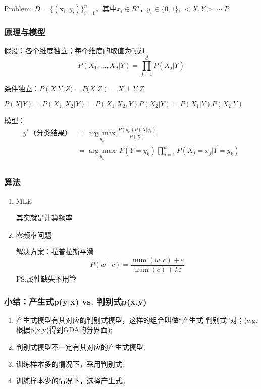 \documentclass[UTF8]{ctexart}
\begin{document}
Problem: $D=\{( \boldsymbol{x}_{i},y_i)\}_{i=1}^{n}$，其中$x_i \in R^d$，$y_i\in \{0,1\}$,  $<X,Y> \sim P$

\dotfill

\subsubsection{原理与模型}

假设：各个维度独立；每个维度的取值为0或1
$$
P(X_1,...,X_d|Y)=\prod^d_{j=1}P(X_j|Y)
$$

\dotfill

 条件独立：$P(X|Y,Z)=P(X|Z)=X\perp Y|Z$
 
 $P(X|Y)=P(X_1,X_2|Y)=P(X_1|X_2,Y)P(X_2|Y)=P(X_1|Y)P(X_2|Y)$
 
 \dotfill

模型：
$$
\begin{aligned}
y^*（分类结果）&=\underset{y_k}{\arg \max } \frac{P(y_k)P(X|y_k)}{P(X)}\\
&=\underset{y_k}{\arg \max }~{P(Y=y_k)\prod_{j=1}^d P(X_j=x_j|Y=y_k)}\\
\end{aligned}
$$



\subsubsection{算法}
\begin{enumerate}
    \item MLE
    
    其实就是计算频率
    \item 零频率问题

解决方案：拉普拉斯平滑
$$
P(w \mid c)=\frac{\operatorname{num}(w, c)+\varepsilon}{\operatorname{num}(c)+k \varepsilon}
$$
PS:属性缺失不用管

\end{enumerate}


\subsubsection{小结：产生式p(y|x) vs. 判别式p(x,y)}
\begin{enumerate}
    \item 产生式模型有其对应的判别式模型，这样的组合叫做“产生式-判别式”对；(e.g. 根据p(x,y)得到GDA的分界面);
    \item 判别式模型不一定有其对应的产生式模型;
    \item 训练样本多的情况下，采用判别式;
    \item 训练样本少的情况下，选择产生式。
\end{enumerate}
\end{document}
